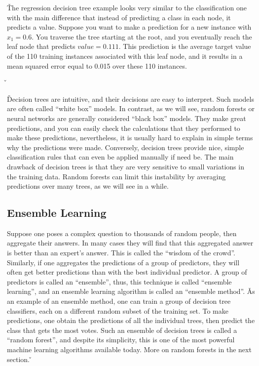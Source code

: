 
\v

The regression decision tree example looks very similar to the classification one with the main difference that
instead of predicting a class in each node, it predicts a value. Suppose you want to make a prediction for a new
instance with $x_1 = 0.6$. You traverse the tree starting at the root, and you eventually reach the leaf node that
predicts $value=0.111$. This prediction is the average target value of the 110 training instances associated with
this leaf node, and it results in a mean squared error equal to 0.015 over these 110 instances.

\v


\v

Decision trees are intuitive, and their decisions are easy to interpret. Such models are often called ``white box''
models. In contrast, as we will see, random forests or neural networks are generally considered ``black box'' models.
They make great predictions, and you can easily check the calculations that they performed to make these predictions,
nevertheless, it is usually hard to explain in simple terms why the predictions were made. Conversely, decision trees
provide nice, simple classification rules that can even be applied manually if need be. The main drawback of decision
trees is that they are very sensitive to small variations in the training data. Random forests can limit this
instability by averaging predictions over many trees, as we will see in a while.

\subsection{Ensemble Learning}

Suppose one poses a complex question to thousands of random people, then aggregate their answers. In many cases they
will find that this aggregated answer is better than an expert's answer. This is called the ``wisdom of the crowd''.
Similarly, if one aggregates the predictions of a group of predictors, they will often get better predictions than
with the best individual predictor. A group of predictors is called an ``ensemble'', thus, this technique is called
``ensemble learning'', and an ensemble learning algorithm is called an ``ensemble method''. \v

As an example of an ensemble method, one can train a group of decision tree classifiers, each on a different random
subset of the training set. To make predictions, one obtain the predictions of all the individual trees, then predict
the class that gets the most votes. Such an ensemble of decision trees is called a ``random forest'', and despite its
simplicity, this is one of the most powerful machine learning algorithms available today. More on random forests in
the next section. \v

